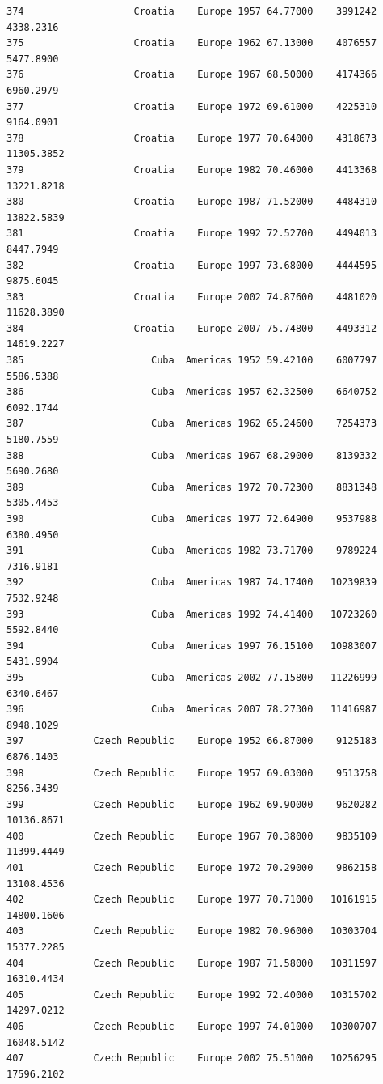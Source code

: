 \documentclass[
  letterpaper,
  DIV=11,
  numbers=noendperiod]{scrreprt}
\begin{document}
\begin{verbatim}
374                   Croatia    Europe 1957 64.77000    3991242   4338.2316
375                   Croatia    Europe 1962 67.13000    4076557   5477.8900
376                   Croatia    Europe 1967 68.50000    4174366   6960.2979
377                   Croatia    Europe 1972 69.61000    4225310   9164.0901
378                   Croatia    Europe 1977 70.64000    4318673  11305.3852
379                   Croatia    Europe 1982 70.46000    4413368  13221.8218
380                   Croatia    Europe 1987 71.52000    4484310  13822.5839
381                   Croatia    Europe 1992 72.52700    4494013   8447.7949
382                   Croatia    Europe 1997 73.68000    4444595   9875.6045
383                   Croatia    Europe 2002 74.87600    4481020  11628.3890
384                   Croatia    Europe 2007 75.74800    4493312  14619.2227
385                      Cuba  Americas 1952 59.42100    6007797   5586.5388
386                      Cuba  Americas 1957 62.32500    6640752   6092.1744
387                      Cuba  Americas 1962 65.24600    7254373   5180.7559
388                      Cuba  Americas 1967 68.29000    8139332   5690.2680
389                      Cuba  Americas 1972 70.72300    8831348   5305.4453
390                      Cuba  Americas 1977 72.64900    9537988   6380.4950
391                      Cuba  Americas 1982 73.71700    9789224   7316.9181
392                      Cuba  Americas 1987 74.17400   10239839   7532.9248
393                      Cuba  Americas 1992 74.41400   10723260   5592.8440
394                      Cuba  Americas 1997 76.15100   10983007   5431.9904
395                      Cuba  Americas 2002 77.15800   11226999   6340.6467
396                      Cuba  Americas 2007 78.27300   11416987   8948.1029
397            Czech Republic    Europe 1952 66.87000    9125183   6876.1403
398            Czech Republic    Europe 1957 69.03000    9513758   8256.3439
399            Czech Republic    Europe 1962 69.90000    9620282  10136.8671
400            Czech Republic    Europe 1967 70.38000    9835109  11399.4449
401            Czech Republic    Europe 1972 70.29000    9862158  13108.4536
402            Czech Republic    Europe 1977 70.71000   10161915  14800.1606
403            Czech Republic    Europe 1982 70.96000   10303704  15377.2285
404            Czech Republic    Europe 1987 71.58000   10311597  16310.4434
405            Czech Republic    Europe 1992 72.40000   10315702  14297.0212
406            Czech Republic    Europe 1997 74.01000   10300707  16048.5142
407            Czech Republic    Europe 2002 75.51000   10256295  17596.2102

\end{verbatim}
\end{document}
